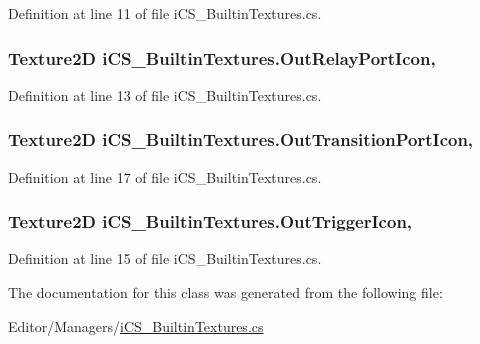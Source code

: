 Definition at line 11 of file i\+C\+S\+\_\+\+Builtin\+Textures.\+cs.

\hypertarget{classi_c_s___builtin_textures_a244c3b7279bd16ac34e4704842f3398e}{
\subsubsection[{Out\+Relay\+Port\+Icon}]{\setlength{\rightskip}{0pt plus 5cm}Texture2\+D i\+C\+S\+\_\+\+Builtin\+Textures.\+Out\+Relay\+Port\+Icon\hspace{0.3cm}{\ttfamily [static]}, {\ttfamily [get]}}}\label{classi_c_s___builtin_textures_a244c3b7279bd16ac34e4704842f3398e}


Definition at line 13 of file i\+C\+S\+\_\+\+Builtin\+Textures.\+cs.

\hypertarget{classi_c_s___builtin_textures_a06b2f56eb61c2851c43d05e42ec68bd1}{
\subsubsection[{Out\+Transition\+Port\+Icon}]{\setlength{\rightskip}{0pt plus 5cm}Texture2\+D i\+C\+S\+\_\+\+Builtin\+Textures.\+Out\+Transition\+Port\+Icon\hspace{0.3cm}{\ttfamily [static]}, {\ttfamily [get]}}}\label{classi_c_s___builtin_textures_a06b2f56eb61c2851c43d05e42ec68bd1}


Definition at line 17 of file i\+C\+S\+\_\+\+Builtin\+Textures.\+cs.

\hypertarget{classi_c_s___builtin_textures_a98e61b571af6c6e7a4128cf086d42c6e}{
\subsubsection[{Out\+Trigger\+Icon}]{\setlength{\rightskip}{0pt plus 5cm}Texture2\+D i\+C\+S\+\_\+\+Builtin\+Textures.\+Out\+Trigger\+Icon\hspace{0.3cm}{\ttfamily [static]}, {\ttfamily [get]}}}\label{classi_c_s___builtin_textures_a98e61b571af6c6e7a4128cf086d42c6e}


Definition at line 15 of file i\+C\+S\+\_\+\+Builtin\+Textures.\+cs.



The documentation for this class was generated from the following file\+:\begin{DoxyCompactItemize}
\item 
Editor/\+Managers/\hyperlink{i_c_s___builtin_textures_8cs}{i\+C\+S\+\_\+\+Builtin\+Textures.\+cs}\end{DoxyCompactItemize}
